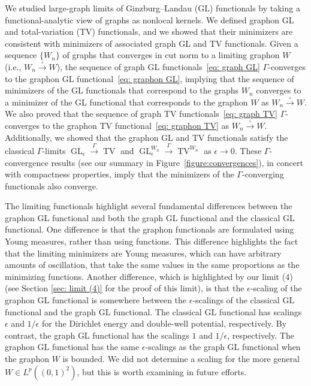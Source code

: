 \documentclass[11pt]{amsart}
\def\ep{\epsilon}
\def\ra{\rightarrow}
\def\gamra{\stackrel{\Gamma}{\longrightarrow}}
\def\sqra{\stackrel{\square}{\longrightarrow}}
\def\GL{\operatorname{GL}}
\def\TV{\operatorname{TV}}
\numberwithin{equation}{section}
\begin{document}
We studied large-graph limits of Ginzburg--Landau (GL) functionals by taking a functional-analytic view of graphs as nonlocal kernels. We defined graphon GL and {total-variation (TV)} functionals, and we showed that their minimizers are consistent with minimizers of {associated} graph GL and TV functionals. Given a sequence $\{W_n\}$ of graphs that converges in cut norm to a limiting graphon $W$ (i.e., $W_n \sqra W$), the sequence of graph GL functionals~\eqref{eq: graph GL} $\Gamma$-converges to the graphon GL functional~\eqref{eq: graphon GL}, implying that the sequence of minimizers of the GL functionals that correspond to the graphs $W_n$ converges to a minimizer of the GL functional that corresponds to the graphon $W$ as $W_n \sqra W$. We also proved that the sequence of graph TV functionals~\eqref{eq: graph TV} 
$\Gamma$-converges to the graphon TV functional~\eqref{eq: graphon TV} {as $W_n \sqra W$}. Additionally, we showed that the graphon GL and TV functionals satisfy the classical $\Gamma$-limits $\GL_\ep \gamra \TV$ and $\GL^{W_n}_\ep \gamra \TV^{W_n}$ as $\ep \ra 0$. These $\Gamma$-convergence results (see our summary in Figure~\ref{figure:convergences}), in concert with compactness properties, imply that the minimizers of the $\Gamma$-converging functionals also converge. 

The limiting functionals highlight several fundamental differences between the graphon GL functional and both the graph GL functional and the classical GL functional. One difference is that the graphon functionals are formulated using Young measures, rather than using functions. This difference highlights the fact that the limiting minimizers are Young measures, which can have arbitrary amounts of oscillation, that take the same values in the same proportions as the minimizing functions. Another difference, which is highlighted by our limit (4) (see Section \ref{sec: limit (4)} for the proof of this limit), is that the $\ep$-scaling of the graphon GL functional is somewhere between the $\ep$-scalings of the classical GL functional and the graph GL functional. 
The classical GL functional has scalings $\ep$ and $1/\ep$ for the Dirichlet energy and double-well potential, respectively. By contrast, the graph GL functional has the scalings $1$ and $1/\ep$, respectively. The graphon GL functional has the same $\ep$-scalings as the graph GL functional when the graphon $W$ is bounded. We did not determine a scaling for the more general $W \in L^p((0,1)^2)$, but this is worth examining in future efforts.
\end{document}
